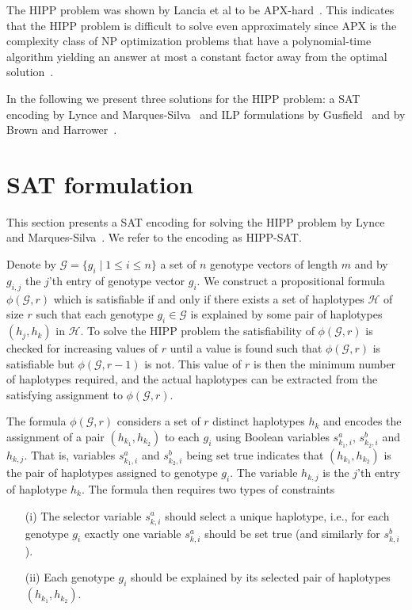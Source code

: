 \documentclass[12pt,a4paper]{article}
\begin{document}
The HIPP problem was shown by Lancia et al to be APX-hard~\cite{DBLP:journals/informs/LanciaPR04}.
This indicates that the HIPP problem is difficult to solve even approximately since APX is the complexity class of NP optimization problems that have a polynomial-time algorithm yielding an answer at most a constant factor away from the optimal solution~\cite{DBLP:books/lib/Ausiello99}.

In the following we present three solutions for the HIPP problem: a SAT encoding by Lynce and Marques-Silva~\cite{DBLP:conf/aaai/LynceM06} and ILP formulations by Gusfield~\cite{DBLP:conf/cpm/Gusfield03} and by Brown and Harrower~\cite{DBLP:journals/tcbb/BrownH06}.

\section{SAT formulation}
\label{sec:hipp-sat}
This section presents a SAT encoding for solving the HIPP problem by Lynce and Marques-Silva~\cite{DBLP:conf/aaai/LynceM06}.
We refer to the encoding as HIPP-SAT.

Denote by $\mathcal{G}=\{g_i\mid 1\leq i \leq n\}$ a set of $n$ genotype vectors of length $m$ and by $g_{i,j}$ the $j$'th entry of genotype vector $g_i$.
We construct a propositional formula $\phi (\mathcal{G}, r)$ which is satisfiable if and only if there exists a set of haplotypes $\mathcal{H}$ of size $r$ such that each genotype $g_i\in \mathcal{G}$ is explained by some pair of haplotypes $(h_j, h_k)$ in $\mathcal{H}$.
To solve the HIPP problem the satisfiability of $\phi (\mathcal{G}, r)$ is checked for increasing values of $r$ until a value is found such that $\phi (\mathcal{G}, r)$ is satisfiable but $\phi (\mathcal{G}, r-1)$ is not.
This value of $r$ is then the minimum number of haplotypes required, and the actual haplotypes can be extracted from the satisfying assignment to $\phi (\mathcal{G}, r)$.

The formula $\phi (\mathcal{G}, r)$ considers a set of $r$ distinct haplotypes $h_k$ and encodes the assignment of a pair $(h_{k_1}, h_{k_2})$ to each $g_i$ using Boolean variables $s^a_{k_1,i}$, $s^b_{k_2,i}$ and $h_{k,j}$.
That is, variables $s^a_{k_1,i}$ and $s^b_{k_2,i}$ being set true indicates that $(h_{k_1}, h_{k_2})$ is the pair of haplotypes assigned to genotype $g_i$.
The variable $h_{k,j}$ is the $j$'th entry of haplotype $h_k$.
The formula then requires two types of constraints
\begin{enumerate}
\item[(i)] The selector variable $s^a_{k,i}$ should select a unique haplotype, i.e., for each genotype $g_i$ exactly one variable $s^a_{k,i}$ should be set true (and similarly for $s^b_{k,i}$). 
\item[(ii)] Each genotype $g_i$ should be explained by its selected pair of haplotypes $(h_{k_1}, h_{k_2})$. 
\end{enumerate}
\end{document}
